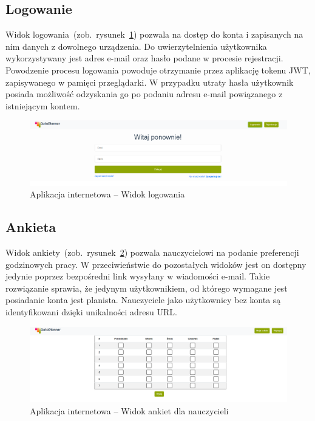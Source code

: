 \subsection{Logowanie}
Widok logowania~(zob.~rysunek~\ref{rys:login}) pozwala na dostęp do konta i zapisanych na nim danych z dowolnego urządzenia. Do uwierzytelnienia użytkownika wykorzystywany jest adres e-mail oraz hasło podane w procesie rejestracji. Powodzenie procesu logowania powoduje otrzymanie przez aplikację tokenu JWT, zapisywanego w pamięci przeglądarki. W przypadku utraty hasła użytkownik posiada możliwość odzyskania go po podaniu adresu e-mail powiązanego z istniejącym kontem.
\begin{figure}[!ht]
\centering\includegraphics[width=\textwidth]{figures/login}
\caption{Aplikacja internetowa -- Widok logowania}\label{rys:login}
\end{figure}
\subsection{Ankieta}
Widok ankiety~(zob.~rysunek~\ref{rys:poll}) pozwala nauczycielowi na podanie preferencji godzinowych pracy. W przeciwieństwie do pozostałych widoków jest on dostępny jedynie poprzez bezpośredni link wysyłany w wiadomości e-mail. Takie rozwiązanie sprawia, że jedynym użytkownikiem, od którego wymagane jest posiadanie konta jest planista. Nauczyciele jako użytkownicy bez konta są identyfikowani dzięki unikalności adresu URL.
\begin{figure}[!ht]
\centering\includegraphics[width=\textwidth]{figures/poll}
\caption{Aplikacja internetowa -- Widok ankiet dla nauczycieli}\label{rys:poll}
\end{figure}
